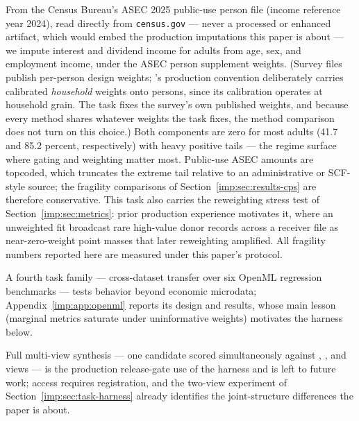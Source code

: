 From the Census Bureau's ASEC 2025 public-use person file (income reference
year 2024), read directly from \texttt{census.gov} --- never a processed or
enhanced artifact, which would embed the production imputations this paper is
about --- we impute interest and dividend income for adults from age, sex,
and employment income, under the ASEC person supplement weights. (Survey
files publish per-person design weights; \populace{}'s production convention
deliberately carries calibrated \emph{household} weights onto persons, since
its calibration operates at household grain. The task fixes the survey's own
published weights, and because every method shares whatever weights the task
fixes, the method comparison does not turn on this choice.) Both components
are zero for most adults (41.7 and 85.2 percent, respectively) with heavy
positive tails --- the regime surface where gating and weighting matter
most. Public-use ASEC amounts are topcoded, which truncates the
extreme tail relative to an administrative or SCF-style source; the fragility
comparisons of Section~\ref{imp:sec:results-cps} are therefore conservative. This task also carries
the reweighting stress test of Section~\ref{imp:sec:metrics}: prior
\policyengine{} production experience motivates it, where an unweighted fit
broadcast rare high-value donor records across a receiver file as
near-zero-weight point masses that later reweighting amplified. All fragility
numbers reported here are measured under this paper's protocol.

A fourth task family --- cross-dataset transfer over six OpenML regression benchmarks ---
tests behavior beyond economic microdata; Appendix~\ref{imp:app:openml} reports its design and
results, whose main lesson (marginal metrics saturate under uninformative weights) motivates the
harness below.

Full multi-view synthesis --- one candidate scored simultaneously against
\cps{}, \sipp{} \citep{census2023sipp}, and \psid{} \citep{psid2023} views ---
is the production release-gate use of the harness and is left to future work;
\psid{} access requires registration, and the two-view experiment of
Section~\ref{imp:sec:task-harness} already identifies the joint-structure
differences the paper is about.
